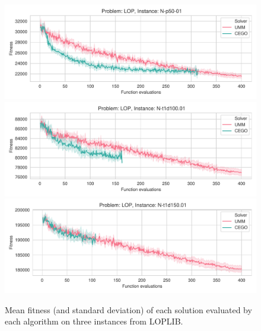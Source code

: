 \documentclass[runningheads]{llncs}
\begin{document}
\begin{figure}[tbp]
  \centering%
  \includegraphics[width=\textwidth]{../img/fitness_real_lop_RandB_N-p50-01}\\
  \includegraphics[width=\textwidth]{../img/fitness_real_lop_RandA1_N-t1d100_01}\\
  \includegraphics[width=\textwidth]{../img/fitness_real_lop_RandA1_N-t1d150_01}\\
    \caption{Mean fitness  (and standard deviation)  of each solution evaluated by each algorithm on three instances from LOPLIB.\label{fig:loplib}}
  \end{figure}
\end{document}
